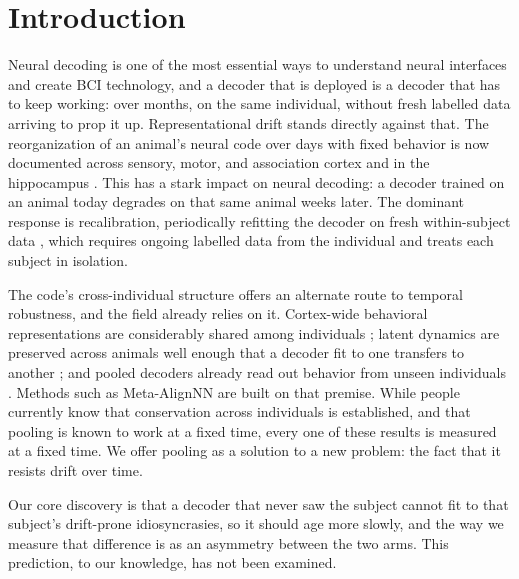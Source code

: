 \documentclass{article}
\begin{document}
\section{Introduction}
Neural decoding is one of the most essential ways to understand neural interfaces and create BCI
technology, and a decoder that is deployed is a decoder that has to keep working: over months, on
the same individual, without fresh labelled data arriving to prop it up. Representational drift
stands directly against that. The reorganization of an animal's neural code over days with fixed
behavior is now documented across sensory, motor, and association cortex and in the hippocampus
\citep{rule2020,driscoll2017,schoonover2021}. This has a stark impact on neural decoding: a decoder
trained on an animal today degrades on that same animal weeks later. The dominant response is
recalibration, periodically refitting the decoder on fresh within-subject data
\citep{degenhart2020,jarosiewicz2015}, which requires ongoing labelled data from the individual and
treats each subject in isolation.

The code's cross-individual structure offers an alternate route to temporal robustness, and the
field already relies on it. Cortex-wide behavioral representations are considerably shared among
individuals \citep{musall2019,macdowell2020,macdowell2024}; latent dynamics are preserved across
animals well enough that a decoder fit to one transfers to another \citep{safaie2023}; and pooled
decoders already read out behavior from unseen individuals \citep{wicat2026,neds2025,peterson2021}.
Methods such as Meta-AlignNN \citep{metaalign2025} are built on that premise. While people currently
know that conservation across individuals is established, and that pooling is known to work at a
fixed time, every one of these results is measured at a fixed time. We offer pooling as a solution
to a new problem: the fact that it resists drift over time.

Our core discovery is that a decoder that never saw the subject cannot fit to that subject's
drift-prone idiosyncrasies, so it should age more slowly, and the way we measure that difference is
as an asymmetry between the two arms. This prediction, to our knowledge, has not been examined.
\end{document}
